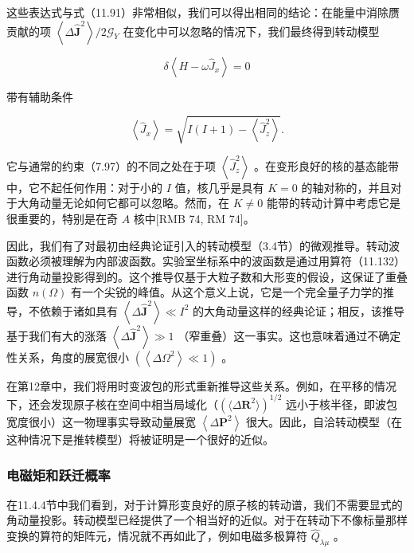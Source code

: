 这些表达式与式（11.91）非常相似，我们可以得出相同的结论：在能量中消除赝贡献的项 $\left\langle {\Delta{\widehat{\boldsymbol{J}}}^{2}}\right\rangle /2{\mathcal{G}}_{Y}$
在变化中可以忽略的情况下，我们最终得到转动模型

\[
\delta\left\langle {H-\omega{\widehat{J}}_{x}}\right\rangle =0\tag{11.135}
\]

带有辅助条件

\[
\left\langle {\widehat{J}}_{x}\right\rangle =\sqrt{I\left({I+1}\right)-\left\langle {\widehat{J}}^{2}_{z}\right\rangle }.\tag{11.136}
\]

它与通常的约束（7.97）的不同之处在于项 $\left\langle {\widehat{J}}^{2}_{z}\right\rangle $
。在变形良好的核的基态能带中，它不起任何作用：对于小的 $I$ 值，核几乎是具有 $K=0$ 的轴对称的，并且对于大角动量无论如何它都可以忽略。然而，在
$K\neq0$ 能带的转动计算中考虑它是很重要的，特别是在奇 $A$ 核中{[}RMB 74, RM 74{]}。

因此，我们有了对最初由经典论证引入的转动模型（3.4节）的微观推导。转动波函数必须被理解为内部波函数。实验室坐标系中的波函数是通过用算符（11.132）进行角动量投影得到的。这个推导仅基于大粒子数和大形变的假设，这保证了重叠函数
$n\left(\Omega\right)$ 有一个尖锐的峰值。从这个意义上说，它是一个完全量子力学的推导，不依赖于诸如具有 $\left\langle {\Delta{\widehat{\boldsymbol{J}}}^{2}}\right\rangle \ll{I}^{2}$
的大角动量这样的经典论证；相反，该推导基于我们有大的涨落 $\left\langle {\Delta{\widehat{\boldsymbol{J}}}^{2}}\right\rangle \gg1$
（窄重叠）这一事实。这也意味着通过不确定性关系，角度的展宽很小 $\left({\left\langle {\Delta{\Omega}^{2}}\right\rangle \ll1}\right)$
。

在第12章中，我们将用时变波包的形式重新推导这些关系。例如，在平移的情况下，还会发现原子核在空间中相当局域化（$(\langle\Delta\boldsymbol{R}^{2}\rangle)^{1/2}$
远小于核半径，即波包宽度很小）这一物理事实导致动量展宽 $\left\langle {\Delta{\boldsymbol{P}}^{2}}\right\rangle $
很大。因此，自洽转动模型（在这种情况下是推转模型）将被证明是一个很好的近似。

\subsubsection{电磁矩和跃迁概率\label{subsec:=007535=0078C1=0077E9=00548C=008DC3=008FC1=006982=007387}}

在11.4.4节中我们看到，对于计算形变良好的原子核的转动谱，我们不需要显式的角动量投影。转动模型已经提供了一个相当好的近似。对于在转动下不像标量那样变换的算符的矩阵元，情况就不再如此了，例如电磁多极算符
${\widehat{Q}}_{\lambda\mu}$ 。

